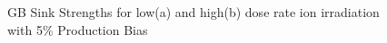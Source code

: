 \documentclass[a4paper]{article}
\begin{document}
      \begin{figure}[h!]  %
        \centering
        \qquad
        \caption{GB Sink Strengths for low(a) and high(b) dose rate ion irradiation with 5\% Production Bias}
        \label{figure:sink_strengths_ion_5_1e-6}
      \end{figure}
\end{document}
